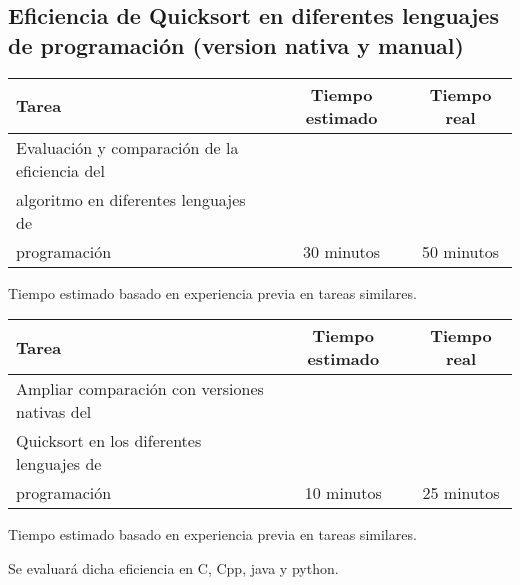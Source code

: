 \documentclass[12pt,a4paper]{article}
\begin{document}
\subsection{Eficiencia de Quicksort en diferentes lenguajes de programación (version nativa y manual)}
    \begin{center}
        \begin{tabular}{|l|c|c|}
            \hline
            \textbf{Tarea} & \textbf{Tiempo estimado} & \textbf{Tiempo real} \\
            \hline
            Evaluación y comparación de la eficiencia del 
\\ algoritmo en diferentes lenguajes de 
\\ programación & 30 minutos & 50 minutos \\
            \hline
        \end{tabular}
    \end{center}
    \begin{center}
        Tiempo estimado basado en experiencia previa en tareas similares.
    \end{center}
    \begin{center}
        \begin{tabular}{|l|c|c|}
            \hline
            \textbf{Tarea} & \textbf{Tiempo estimado} & \textbf{Tiempo real} \\
            \hline
            Ampliar comparación con versiones nativas del 
\\Quicksort en los diferentes lenguajes de 
\\programación & 10 minutos & 25 minutos \\
            \hline
        \end{tabular}
    \end{center}
    \begin{center}
        Tiempo estimado basado en experiencia previa en tareas similares.
    \end{center}
Se evaluará dicha eficiencia en C, Cpp, java y python.
\newline
{}
\end{document}
